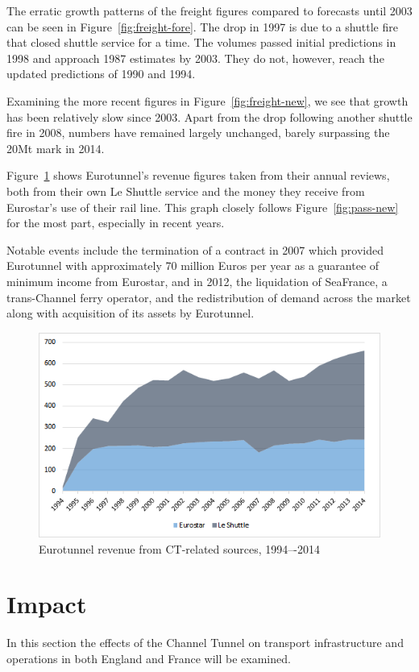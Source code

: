 \documentclass[12pt]{article} %
\begin{document}
The erratic growth patterns of the freight figures compared to forecasts until 2003 can be seen in Figure~\ref{fig:freight-fore}. The drop in 1997 is due to a shuttle fire that closed shuttle service for a time. The volumes passed initial predictions in 1998 and approach 1987 estimates by 2003. They do not, however, reach the updated predictions of 1990 and 1994.

Examining the more recent figures in Figure~\ref{fig:freight-new}, we see that growth has been relatively slow since 2003. Apart from the drop following another shuttle fire in 2008, numbers have remained largely unchanged, barely surpassing the 20Mt mark in 2014.

Figure~\ref{fig:revenue} shows Eurotunnel's revenue figures taken from their annual reviews\cite{et-reports}, both from their own Le Shuttle service and the money they receive from Eurostar's use of their rail line. This graph closely follows Figure~\ref{fig:pass-new} for the most part, especially in recent years. 

Notable events include the termination of a contract in 2007 which provided Eurotunnel with approximately 70 million Euros per year as a guarantee of minimum income from Eurostar, and in 2012, the liquidation of SeaFrance, a trans-Channel ferry operator, and the redistribution of demand across the market along with acquisition of its assets by Eurotunnel.\cite{et-reports}

\begin{figure}[hp]
  \centering
  \includegraphics[width=\textwidth]{revenue}
  \caption{Eurotunnel revenue from CT-related sources, 1994–-2014}
  \label{fig:revenue}
\end{figure}

\section{Impact}
In this section the effects of the Channel Tunnel on transport infrastructure and operations in both England and France will be examined.
\end{document}
